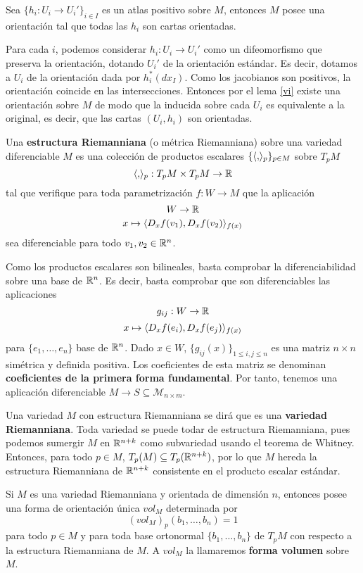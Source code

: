 \documentclass[CV.tex]{subfiles}
\begin{document}
\begin{prop}
Sea $\{h_i:U_i\to U_i'\}_{i\in I}$ es un atlas positivo sobre $M$, entonces $M$ posee una orientación tal que todas las $h_i$ son cartas orientadas.
\end{prop}
\begin{dem}
Para cada $i$, podemos considerar $h_i:U_i\to U_i'$ como un difeomorfismo que preserva la orientación, dotando $U_i'$ de la orientación estándar. Es decir, dotamos a $U_i$ de la orientación dada por $h_i^*(dx_I)$. Como los jacobianos son positivos, la orientación coincide en las intersecciones. Entonces por el lema \ref{vi} existe una orientación sobre $M$ de modo que la inducida sobre cada $U_i$ es equivalente a la original, es decir, que las cartas $(U_i,h_i)$ son orientadas.
\QED
\end{dem}


\begin{defi}
Una \textbf{estructura Riemanniana} (o métrica Riemanniana) sobre una variedad diferenciable $M$ es una colección de productos escalares $\{\langle{,}\rangle_p\}_{p\in M}$ sobre $T_pM$
\[
\langle{,}\rangle_p:T_pM\times T_pM\to\mathbb{R}
\] 
tal que verifique para toda parametrización $f:W\to M$ que la aplicación
\[
W\to\mathbb{R}
\]
\[
x\mapsto \langle{D_xf(v_1),D_xf(v_2)}\rangle_{f(x)}
\]
sea diferenciable para todo $v_1,v_2\in\mathbb{R}^n$.
\end{defi}

Como los productos escalares son bilineales, basta comprobar la diferenciabilidad sobre una base de $\mathbb{R}^n$.  Es decir, basta comprobar que son diferenciables las aplicaciones
\[
g_{ij}:W\to \mathbb{R}
\]
\[
x\mapsto \langle{D_x f(e_i),D_xf(e_j)}\rangle_{f(x)}
\]
para $\{e_1,\dots, e_n\}$ base de $\mathbb{R}^n$. Dado $x\in W$, $\{g_{ij}(x)\}_{1\leq i,j\leq n}$ es una matriz $n\times n$ simétrica y definida positiva. Los coeficientes de esta matriz se denominan \textbf{coeficientes de la primera forma fundamental}. Por tanto, tenemos una aplicación diferenciable $M\to S\subseteq \mathcal{M}_{n\times m}$.  

Una variedad $M$ con estructura Riemanniana se dirá que es una \textbf{variedad Riemanniana}. Toda variedad se puede todar de estructura Riemanniana, pues podemos sumergir $M$ en $\mathbb{R}^{n+k}$ como subvariedad usando el teorema de Whitney. Entonces, para todo $p\in M$, $T_p(M)\subseteq T_p(\mathbb{R}^{n+k})$, por lo que $M$ hereda la estructura Riemanniana de $\mathbb{R}^{n+k}$ consistente en el producto escalar estándar.


\begin{prop}
Si $M$ es una variedad Riemanniana y orientada de dimensión $n$, entonces posee una forma de orientación única $vol_M$ determinada por
\[
(vol_M)_p(b_1,\dots, b_n)=1
\]
para todo $p\in M$ y para toda base ortonormal $\{b_1,\dots, b_n\}$ de $T_pM$ con respecto a la estructura Riemanniana de $M$. A $vol_M$ la llamaremos \textbf{forma volumen} sobre $M$.
\end{prop}
\end{document}
